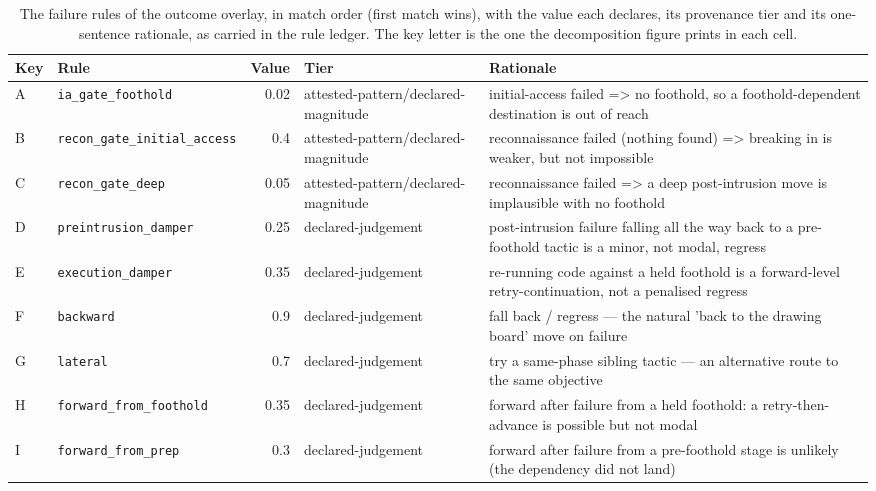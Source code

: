 
\begin{table}[htbp]
\centering\scriptsize
\caption{The failure rules of the outcome overlay, in match order (first match wins), with the value each declares, its provenance tier and its one-sentence rationale, as carried in the rule ledger. The key letter is the one the decomposition figure prints in each cell.}
\label{tab:overlay-failure-rules}
\begin{tabular}{@{}l l r p{} p{}@{}}
\toprule
Key & Rule & Value & Tier & Rationale \\
\midrule
A & \texttt{ia\_gate\_foothold} & 0.02 & attested-pattern/\allowbreak declared-magnitude & initial-access failed => no foothold, so a foothold-dependent destination is out of reach \\
B & \texttt{recon\_gate\_initial\_access} & 0.4 & attested-pattern/\allowbreak declared-magnitude & reconnaissance failed (nothing found) => breaking in is weaker, but not impossible \\
C & \texttt{recon\_gate\_deep} & 0.05 & attested-pattern/\allowbreak declared-magnitude & reconnaissance failed => a deep post-intrusion move is implausible with no foothold \\
D & \texttt{preintrusion\_damper} & 0.25 & declared-judgement & post-intrusion failure falling all the way back to a pre-foothold tactic is a minor, not modal, regress \\
E & \texttt{execution\_damper} & 0.35 & declared-judgement & re-running code against a held foothold is a forward-level retry-continuation, not a penalised regress \\
F & \texttt{backward} & 0.9 & declared-judgement & fall back / regress — the natural 'back to the drawing board' move on failure \\
G & \texttt{lateral} & 0.7 & declared-judgement & try a same-phase sibling tactic — an alternative route to the same objective \\
H & \texttt{forward\_from\_foothold} & 0.35 & declared-judgement & forward after failure from a held foothold: a retry-then-advance is possible but not modal \\
I & \texttt{forward\_from\_prep} & 0.3 & declared-judgement & forward after failure from a pre-foothold stage is unlikely (the dependency did not land) \\
\bottomrule
\end{tabular}
\end{table}

